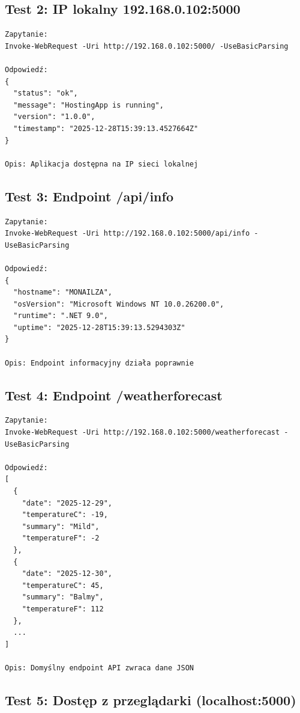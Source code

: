 \documentclass[twoside]{article}
\begin{document}
\subsection{Test 2: IP lokalny 192.168.0.102:5000}

\begin{verbatim}
Zapytanie:
Invoke-WebRequest -Uri http://192.168.0.102:5000/ -UseBasicParsing

Odpowiedź:
{
  "status": "ok",
  "message": "HostingApp is running",
  "version": "1.0.0",
  "timestamp": "2025-12-28T15:39:13.4527664Z"
}

Opis: Aplikacja dostępna na IP sieci lokalnej
\end{verbatim}

\subsection{Test 3: Endpoint /api/info}

\begin{verbatim}
Zapytanie:
Invoke-WebRequest -Uri http://192.168.0.102:5000/api/info -UseBasicParsing

Odpowiedź:
{
  "hostname": "MONAILZA",
  "osVersion": "Microsoft Windows NT 10.0.26200.0",
  "runtime": ".NET 9.0",
  "uptime": "2025-12-28T15:39:13.5294303Z"
}

Opis: Endpoint informacyjny działa poprawnie
\end{verbatim}

\subsection{Test 4: Endpoint /weatherforecast}

\begin{verbatim}
Zapytanie:
Invoke-WebRequest -Uri http://192.168.0.102:5000/weatherforecast -UseBasicParsing

Odpowiedź:
[
  {
    "date": "2025-12-29",
    "temperatureC": -19,
    "summary": "Mild",
    "temperatureF": -2
  },
  {
    "date": "2025-12-30",
    "temperatureC": 45,
    "summary": "Balmy",
    "temperatureF": 112
  },
  ...
]

Opis: Domyślny endpoint API zwraca dane JSON
\end{verbatim}

\subsection{Test 5: Dostęp z przeglądarki (localhost:5000)}
\end{document}

